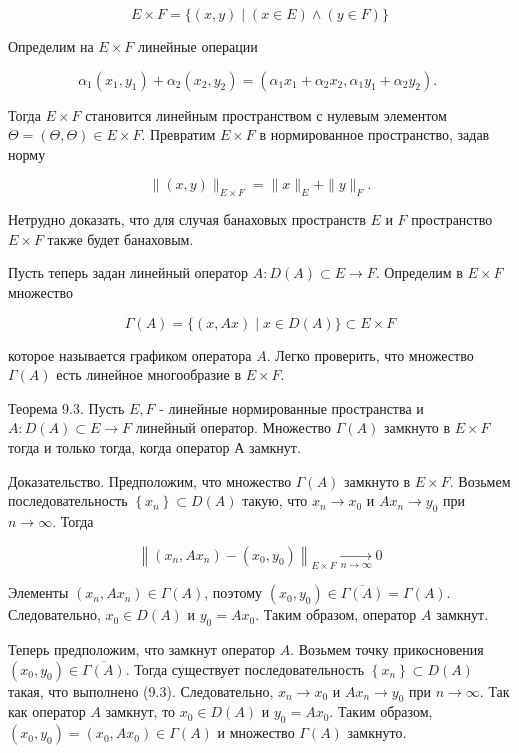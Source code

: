 \[
E \times F=\{(x, y) \mid(x \in E) \wedge(y \in F)\}
\]

Определим на $E \times F$ линейные операции

\[
\alpha_{1}\left(x_{1}, y_{1}\right)+\alpha_{2}\left(x_{2}, y_{2}\right)=\left(\alpha_{1} x_{1}+\alpha_{2} x_{2}, \alpha_{1} y_{1}+\alpha_{2} y_{2}\right) \text {. }
\]

Тогда $E \times F$ становится линейным пространством с нулевым элементом $\Theta=(\Theta, \Theta) \in E \times F$. Превратим $E \times F$ в нормированное пространство, задав норму

\[
\|(x, y)\|_{E \times F}=\|x\|_{E}+\|y\|_{F} .
\]

Нетрудно доказать, что для случая банаховых пространств $E$ и $F$ пространство $E \times F$ также будет банаховым.

Пусть теперь задан линейный оператор $A: D(A) \subset E \rightarrow F$. Определим в $E \times F$ множество

\[
\Gamma(A)=\{(x, A x) \mid x \in D(A)\} \subset E \times F
\]

которое называется графиком оператора $A$. Легко проверить, что множество $\Gamma(A)$ есть линейное многообразие в $E \times F$.

Теорема 9.3. Пусть $E, F$ - линейные нормированные пространства и $A: D(A) \subset E \rightarrow F$ линейный оператор. Множество $\Gamma(A)$ замкнуто в $E \times F$ тогда и только тогда, когда оператор $А$ замкнут.

Доказательство. Предположим, что множество $\Gamma(A)$ замкнуто в $E \times F$. Возьмем последовательность $\left\{x_{n}\right\} \subset D(A)$ такую, что $x_{n} \rightarrow x_{0}$ и $A x_{n} \rightarrow y_{0}$ при $n \rightarrow \infty$. Тогда

\[
\left\|\left(x_{n}, A x_{n}\right)-\left(x_{0}, y_{0}\right)\right\|_{E \times F} \underset{n \rightarrow \infty}{\longrightarrow} 0
\]

Элементы $\left(x_{n}, A x_{n}\right) \in \Gamma(A)$, поэтому $\left(x_{0}, y_{0}\right) \in \overline{\Gamma(A)}=\Gamma(A)$. Следовательно, $x_{0} \in D(A)$ и $y_{0}=A x_{0}$. Таким образом, оператор $A$ замкнут.

Теперь предположим, что замкнут оператор $A$. Возьмем точку прикосновения $\left(x_{0}, y_{0}\right) \in \overline{\Gamma(A)}$. Тогда существует последовательность $\left\{x_{n}\right\} \subset D(A)$ такая, что выполнено (9.3). Следовательно, $x_{n} \rightarrow x_{0}$ и $A x_{n} \rightarrow y_{0}$ при $n \rightarrow \infty$. Так как оператор $A$ замкнут, то $x_{0} \in D(A)$ и $y_{0}=A x_{0}$. Таким образом, $\left(x_{0}, y_{0}\right)=\left(x_{0}, A x_{0}\right) \in \Gamma(A)$ и множество $\Gamma(A)$ замкнуто.

